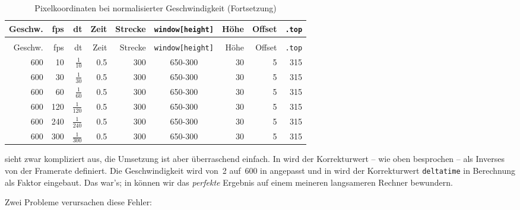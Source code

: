 \begin{longtable}{r@{ * }r@{ * }r@{ * }r@{ = }r@{ $\rightarrow$ }c@{ - }r@{ - }r@{ = }r}%
	\caption{Pixelkoordinaten bei normalisierter Geschwindigkeit}\label{tabFpsBewegung03} \\[1em]
    Geschw. & fps & dt  & Zeit  & Strecke & \texttt{window[height]} & Höhe & Offset & \texttt{.top}\\[0.5em]\hline\hline
	\hline
	\endfirsthead %
	\caption{Pixelkoordinaten bei normalisierter Geschwindigkeit (Fortsetzung)}\\[1em]
    Geschw. & fps & dt  & Zeit  & Strecke & \texttt{window[height]} & Höhe & Offset & \texttt{.top}\\[0.5em]\hline\hline
	\hline
	\endhead %
	600  &   10 &  $\frac{1}{10}$   & 0.5 & 300 & 650-300 & 30 & 5 & 315 \\ \hline
	600  &   30 &  $\frac{1}{30}$   & 0.5 & 300 & 650-300 & 30 & 5 & 315 \\ \hline
	600  &   60 &  $\frac{1}{60}$   & 0.5 & 300 & 650-300 & 30 & 5 & 315 \\ \hline
	600  &  120 &  $\frac{1}{120}$  & 0.5 & 300 & 650-300 & 30 & 5 & 315 \\ \hline
	600  &  240 &  $\frac{1}{240}$  & 0.5 & 300 & 650-300 & 30 & 5 & 315 \\ \hline
	600  &  300 &  $\frac{1}{300}$  & 0.5 & 300 & 650-300 & 30 & 5 & 315 \\ \hline
\end{longtable} 

 sieht zwar kompliziert aus, die Umsetzung ist aber überraschend einfach. In  wird der Korrekturwert -- wie oben besprochen -- als Inverses von der Framerate definiert. Die Geschwindigkeit wird von~2 auf~600 in  angepasst und in  wird der Korrekturwert \texttt{deltatime} in Berechnung als Faktor eingebaut. Das war's; in  können wir das \emph{perfekte} Ergebnis auf einem meineren langsameren Rechner bewundern. 


Zwei Probleme verursachen diese Fehler:

